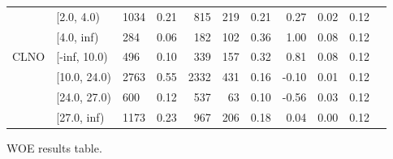 \begin{landscape}
\begin{figure}[!ht]
\begin{tabular}{lllrrrrrrrr}
			     &   [2.0, 4.0) &   1034 &         0.21 &   815 &  219 &     0.21 &  0.27 &    0.02 &      0.12 \\
			     &   [4.0, inf) &    284 &         0.06 &   182 &  102 &     0.36 &  1.00 &    0.08 &      0.12 \\
			\midrule
			    CLNO &  [-inf, 10.0) &    496 &         0.10 &   339 &  157 &     0.32 &  0.81 &    0.08 &      0.12 \\
			     &  [10.0, 24.0) &   2763 &         0.55 &  2332 &  431 &     0.16 & -0.10 &    0.01 &      0.12 \\
			     &  [24.0, 27.0) &    600 &         0.12 &   537 &   63 &     0.10 & -0.56 &    0.03 &      0.12 \\
			     &   [27.0, inf) &   1173 &         0.23 &   967 &  206 &     0.18 &  0.04 &    0.00 &      0.12 \\
			\bottomrule
		\end{tabular}
		\caption{WOE results table. \label{woe_2}}
	\end{figure}
\end{landscape}